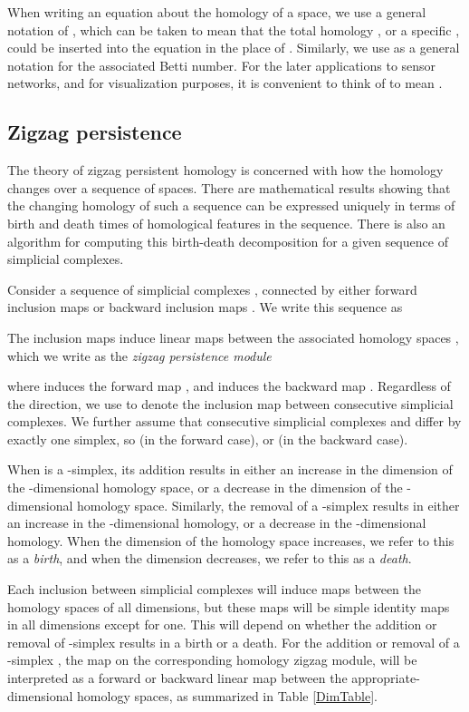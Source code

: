 \documentclass[12pt]{article}
\begin{document}
When writing an equation about the homology of a space, we use a general notation of , which can be taken to mean that the total homology , or a specific , could be inserted into the equation in the place of . Similarly, we use  as a general notation for the associated Betti number. For the later applications to sensor networks, and for visualization purposes, it is convenient to think of  to mean .

\subsection{Zigzag persistence}
The theory of zigzag persistent homology is concerned with how the homology changes over a sequence of spaces. There are mathematical results \cite{carlsson2010} showing that the changing homology of such a sequence can be expressed uniquely in terms of birth and death times of homological features in the sequence. There is also an algorithm \cite{carlsson2009b} for computing this birth-death decomposition for a given sequence of simplicial complexes.

Consider a sequence of simplicial complexes , connected by either forward inclusion maps  or backward inclusion maps . We write this sequence as



The inclusion maps induce linear maps between the associated homology spaces , which we write as the \emph{zigzag persistence module}


where  induces the forward map , and  induces the backward map . Regardless of the direction, we use  to denote the inclusion map between consecutive simplicial complexes. We further assume that consecutive simplicial complexes  and  differ by exactly one simplex, so  (in the forward case), or  (in the backward case).

When  is a -simplex, its addition results in either an increase in the dimension of the -dimensional homology space, or a decrease in the dimension of the -dimensional homology space. Similarly, the removal of a -simplex  results in either an increase in the -dimensional homology, or a decrease in the -dimensional homology. When the dimension of the homology space increases, we refer to this as a \emph{birth}, and when the dimension decreases, we refer to this as a \emph{death}.


Each inclusion between simplicial complexes will induce maps between the homology spaces of all dimensions, but these maps will be simple identity maps in all dimensions except for one. This will depend on whether the addition or removal of -simplex  results in a birth or a death. For the addition or removal of a -simplex , the map  on the corresponding homology zigzag module, will be interpreted as a forward or backward linear map between the appropriate-dimensional homology spaces, as summarized in Table \ref{DimTable}.
\end{document}
